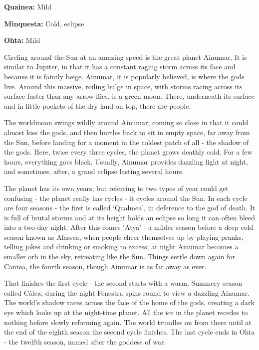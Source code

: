 \begin{multicols}{2}
\begin{tcolorbox}
\begin{list}{\addtocounter{enc}{1} \bf Cycle }{}
\begin{list}{\addtocounter{list}{1}}{}
\item \textbf{Quainea:}  Mild

\item \textbf{Minquesta:}  Cold, eclipse

\item \textbf{Ohta:}  Mild

\end{list}

\end{list}

\end{tcolorbox}

Circling around the Sun at an amazing speed is the great planet Ainumar.
It is similar to Jupiter, in that it has a constant raging storm across its face and because it is faintly beige.
Ainumar, it is popularly believed, is where the gods live.
Around this massive, roiling bulge in space, with storms racing across its surface faster than any arrow flies, is a green moon.
There, underneath its surface and in little pockets of the dry land on top, there are people.

The worldmoon swings wildly around Ainumar, coming so close in that it could almost kiss the gods, and then hurtles back to sit in empty space, far away from the Sun, before landing for a moment in the coldest patch of all - the shadow of the gods.
Here, twice every three cycles, the planet grows deathly cold.
For a few hours, everything goes black.
Usually, Ainumar provides dazzling light at night, and sometimes, after, a grand eclipse lasting several hours.

The planet has its own years, but referring to two types of year could get confusing - the planet really has cycles - it cycles around the Sun.
In each cycle are four seasons - the first is called `Qualmea', in deference to the god of death.
It is full of brutal storms and at its height holds an eclipse so long it can often bleed into a two-day night.
After this comes `Atya' - a milder season before a deep cold season known as Alassea, when people cheer themselves up by playing pranks, telling jokes and drinking or smoking to excess; at night Ainumar becomes a smaller orb in the sky, retreating like the Sun.
Things settle down again for Cantea, the fourth season, though Ainumar is as far away as ever.

That finishes the first cycle - the second starts with a warm, Summery season called C\'{a}lea; during the night Fenestra spins round to view a dazzling Ainumar.
The world's shadow races across the face of the home of the gods, creating a dark eye which looks up at the night-time planet.
All the ice in the planet recedes to nothing before slowly reforming again.
The world trundles on from there until at the end of the eighth season the second cycle finishes.
 The last cycle ends in Ohta - the twelfth season, named after the goddess of war.

\end{multicols}

